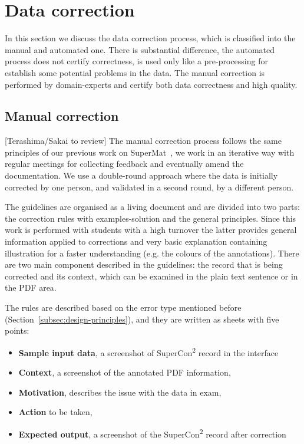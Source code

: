 \documentclass[a4paper]{article}
\begin{document}
\section{Data correction}
In this section we discuss the data correction process, which is classified into the manual and automated one. There is substantial difference, the automated process does not certify correctness, is used only like a pre-processing for establish some potential problems in the data. 
The manual correction is performed by domain-experts and certify both data correctness and high quality. 

\subsection{Manual correction}
[Terashima/Sakai to review]  
The manual correction process follows the same principles of our previous work on SuperMat~\cite{foppiano2021supermat}, we work in an iterative way with regular meetings for collecting feedback and eventually amend the documentation. 
We use a double-round approach where the data is initially corrected by one person, and validated in a second round, by a different person. 

The guidelines are organised as a living document and are divided into two parts: the correction rules with examples-solution and the general principles.
Since this work is performed with students with a high turnover the latter provides general information applied to corrections and very basic explanation containing illustration for a faster understanding (e.g. the colours of the annotations). 
There are two main component described in the guidelines: the record that is being corrected and its context, which can be examined in the plain text sentence or in the PDF area. 

The rules are described based on the error type mentioned before (Section~\ref{subsec:design-principles}), and they are written as sheets with five points:
\begin{itemize}
    \item \textbf{Sample input data}, a screenshot of SuperCon\textsuperscript{2} record in the interface
    \item \textbf{Context}, a screenshot of the annotated PDF information,
    \item \textbf{Motivation}, describes the issue with the data in exam, 
    \item \textbf{Action} to be taken, 
    \item \textbf{Expected output}, a screenshot of the SuperCon\textsuperscript{2} record after correction
\end{itemize}
\end{document}
